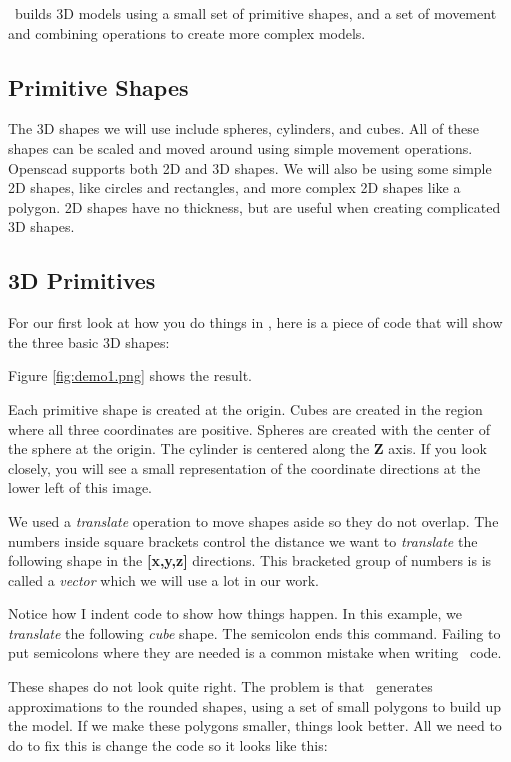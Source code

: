\osc\ builds 3D models using a small set of primitive shapes, and a set of
movement and combining operations to create more complex models.

\subsection{Primitive Shapes}

The 3D shapes we will use include spheres, cylinders, and cubes. All of these
shapes can be scaled and moved around using simple movement operations.
Openscad supports both 2D and 3D shapes. We will also be using some simple 2D
shapes, like circles and rectangles, and more complex 2D shapes like a polygon.
2D shapes have no thickness, but are useful when creating complicated 3D
shapes.

\subsection{3D Primitives}
For our first look at how you do things in \osc, here is a piece of code
that will show the three basic 3D shapes:


Figure \ref{fig:demo1.png} shows the result.


Each primitive shape is created at the origin. Cubes are created in the region
where all three coordinates are positive. Spheres are created with the center
of the sphere at the origin. The cylinder is centered along the {\bf Z} axis.
If you look closely, you will see a small representation of the coordinate
directions at the lower left of this image.

We used a {\it translate} operation to move shapes aside so they do not
overlap. The numbers inside square brackets control the distance we want to
{\it translate} the following shape in the {\bf [x,y,z]} directions. This
bracketed group of numbers is is called a {\it vector} which we will use a lot
in our work.

Notice how I indent code to show how things happen. In this example, we {\it
translate} the following {\it cube} shape. The semicolon ends this command.
Failing to put semicolons where they are needed is a common mistake when
writing \osc\ code.

These shapes do not look quite right. The problem is that \osc\  generates
approximations to the rounded shapes, using a set of small polygons to build up
the model. If we make these polygons smaller, things look better. All we need
to do to fix this is change the code so it looks like this:


